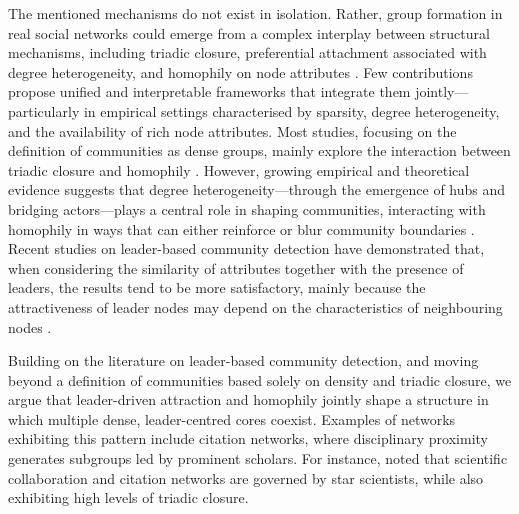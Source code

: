 \documentclass[11pt]{article}
\begin{document}

The mentioned mechanisms do not exist in isolation. Rather, group formation in real social networks could emerge from a complex interplay between structural mechanisms, including triadic closure, preferential attachment associated with degree heterogeneity, and homophily on node attributes \citep{bachmann2025network}. Few contributions propose unified and interpretable frameworks that integrate them jointly—particularly in empirical settings characterised by sparsity, degree heterogeneity, and the availability of rich node attributes. Most studies, focusing on the definition of communities as dense groups, mainly explore the interaction between triadic closure and homophily \citep{triadichomophily,Peixoto2022DisentanglingNetworks, Mosleh2025}. However, growing empirical and theoretical evidence suggests that degree heterogeneity—through the emergence of hubs and bridging actors—plays a central role in shaping communities, interacting with homophily in ways that can either reinforce or blur community boundaries \citep{bachmann2025network,FUHSE202443,KOZITSIN2023100248}.
Recent studies on leader-based community detection have demonstrated that, when considering the similarity of attributes together with the presence of leaders, the results tend to be more satisfactory, mainly because the attractiveness of leader nodes may depend on the characteristics of neighbouring nodes \citep{Helal2016AnNetworks,Lu2021Leader-BasedNetworks,Hu2024Network-adjustedDetection}. 

Building on the literature on leader-based community detection, and moving beyond a definition of communities based solely on density and triadic closure, we argue that leader-driven attraction and homophily jointly shape a structure in which multiple dense, leader-centred cores coexist.
Examples of networks exhibiting this pattern include citation networks, where disciplinary proximity generates subgroups led by prominent scholars. For instance, \cite{NewmanClusteringPA} noted that scientific collaboration and citation networks are governed by star scientists, while also exhibiting high levels of triadic closure. %
\end{document}
